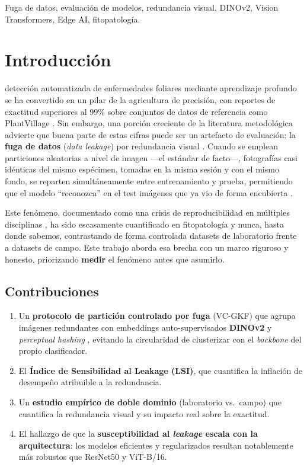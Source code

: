 \documentclass[journal,compsoc]{IEEEtran}
\begin{document}
\begin{IEEEkeywords}
Fuga de datos, evaluación de modelos, redundancia visual, DINOv2, Vision Transformers, Edge AI, fitopatología.
\end{IEEEkeywords}

\section{Introducción}
 detección automatizada de enfermedades foliares mediante aprendizaje profundo se ha convertido en un pilar de la agricultura de precisión, con reportes de exactitud superiores al 99\% sobre conjuntos de datos de referencia como PlantVillage \cite{hughes2015open, mohanty2016using}. Sin embargo, una porción creciente de la literatura metodológica advierte que buena parte de estas cifras puede ser un artefacto de evaluación: la \textbf{fuga de datos} (\textit{data leakage}) por redundancia visual \cite{kapoor2023leakage}. Cuando se emplean particiones aleatorias a nivel de imagen ---el estándar de facto---, fotografías casi idénticas del mismo espécimen, tomadas en la misma sesión y con el mismo fondo, se reparten simultáneamente entre entrenamiento y prueba, permitiendo que el modelo ``reconozca'' en el test imágenes que ya vio de forma encubierta \cite{roberts2017crossval}.

Este fenómeno, documentado como una crisis de reproducibilidad en múltiples disciplinas \cite{kapoor2023leakage}, ha sido escasamente cuantificado en fitopatología y nunca, hasta donde sabemos, contrastando de forma controlada datasets de laboratorio frente a datasets de campo. Este trabajo aborda esa brecha con un marco riguroso y honesto, priorizando \textbf{medir} el fenómeno antes que asumirlo.

\subsection*{Contribuciones}
\begin{enumerate}
\item Un \textbf{protocolo de partición controlado por fuga} (VC-GKF) que agrupa imágenes redundantes con embeddings auto-supervisados \textbf{DINOv2} \cite{oquab2024dinov2} y \textit{perceptual hashing} \cite{zauner2010phash}, evitando la circularidad de clusterizar con el \textit{backbone} del propio clasificador.
\item El \textbf{Índice de Sensibilidad al Leakage (LSI)}, que cuantifica la inflación de desempeño atribuible a la redundancia.
\item Un \textbf{estudio empírico de doble dominio} (laboratorio vs.\ campo) que cuantifica la redundancia visual y su impacto real sobre la exactitud.
\item El hallazgo de que la \textbf{susceptibilidad al \textit{leakage} escala con la arquitectura}: los modelos eficientes y regularizados resultan notablemente más robustos que ResNet50 y ViT-B/16.
\end{enumerate}
\end{document}
